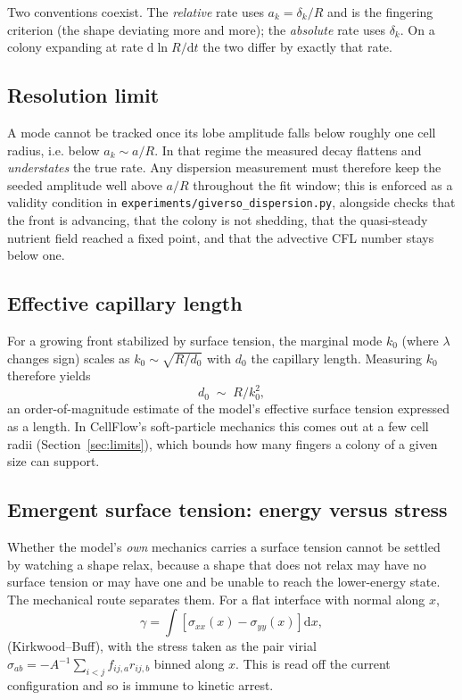 \documentclass[11pt]{article}
\begin{document}
Two conventions coexist. The \emph{relative} rate uses $a_k=\delta_k/R$ and is the
fingering criterion (the shape deviating more and more); the \emph{absolute} rate
uses $\delta_k$. On a colony expanding at rate $\mathrm{d}\ln R/\mathrm{d}t$ the
two differ by exactly that rate.

\subsection{Resolution limit}
A mode cannot be tracked once its lobe amplitude falls below roughly one cell
radius, i.e. below $a_k \sim a/R$. In that regime the measured decay flattens and
\emph{understates} the true rate. Any dispersion measurement must therefore keep
the seeded amplitude well above $a/R$ throughout the fit window; this is enforced
as a validity condition in \texttt{experiments/giverso\_dispersion.py}, alongside
checks that the front is advancing, that the colony is not shedding, that the
quasi-steady nutrient field reached a fixed point, and that the advective CFL
number stays below one.

\subsection{Effective capillary length}
For a growing front stabilized by surface tension, the marginal mode $k_0$ (where
$\lambda$ changes sign) scales as $k_0\sim\sqrt{R/d_0}$ with $d_0$ the capillary
length. Measuring $k_0$ therefore yields
\begin{equation}
  d_0 \;\sim\; R/k_0^2,
\end{equation}
an order-of-magnitude estimate of the model's effective surface tension expressed
as a length. In CellFlow's soft-particle mechanics this comes out at a few cell
radii (Section~\ref{sec:limits}), which bounds how many fingers a colony of a
given size can support.

\subsection{Emergent surface tension: energy versus stress}\label{sec:kb}

Whether the model's \emph{own} mechanics carries a surface tension cannot be
settled by watching a shape relax, because a shape that does not relax may have
no surface tension or may have one and be unable to reach the lower-energy state.
The mechanical route separates them. For a flat interface with normal along $x$,
\begin{equation}
  \gamma = \int \left[\sigma_{xx}(x) - \sigma_{yy}(x)\right]\mathrm{d}x ,
\end{equation}
(Kirkwood--Buff), with the stress taken as the pair virial
$\sigma_{ab}=-A^{-1}\sum_{i<j} f_{ij,a} r_{ij,b}$ binned along $x$. This is read
off the current configuration and so is immune to kinetic arrest.
\end{document}
